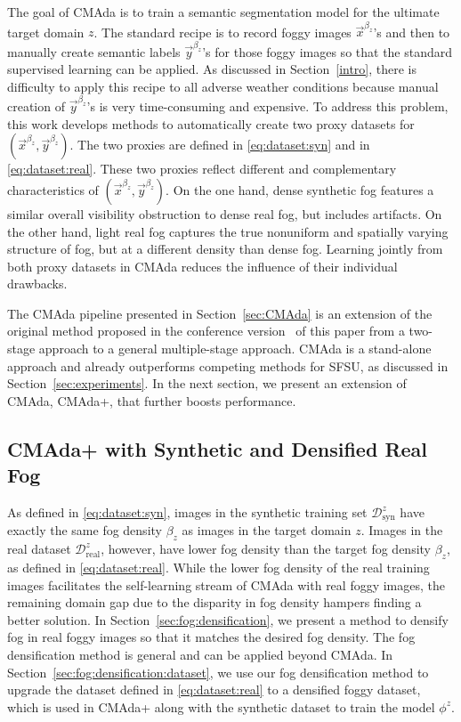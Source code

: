 \documentclass[twocolumn]{svjour3}          \smartqed  \usepackage{graphicx}
\begin{document}
The goal of CMAda is to train a semantic segmentation model for the ultimate target domain $z$. The standard recipe is to record foggy images $\vec{x}^{\beta_z}$'s and then to manually create semantic labels $\vec{y}^{\beta_z}$'s for those foggy images so that the standard supervised learning can be applied. As discussed in Section~\ref{intro}, there is difficulty to apply this recipe to all adverse weather conditions because manual creation of $\vec{y}^{\beta_z}$'s is very time-consuming and expensive. To address this problem, this work develops methods to automatically create two proxy datasets for $(\vec{x}^{\beta_z}, \vec{y}^{\beta_z})$. The two proxies are defined in \eqref{eq:dataset:syn} and in \eqref{eq:dataset:real}. These two proxies reflect different and complementary characteristics of $(\vec{x}^{\beta_z}, \vec{y}^{\beta_z})$.  On the one hand, dense synthetic fog features a similar overall visibility obstruction to dense real fog, but includes artifacts. On the other hand, light real fog captures the true nonuniform and spatially varying structure of fog, but at a different density than dense fog. Learning jointly from both proxy datasets in CMAda reduces the influence of their individual drawbacks.

The CMAda pipeline presented in Section~\ref{sec:CMAda} is an extension of the original method proposed in the conference version~\cite{dense:SFSU:eccv18} of this paper from a two-stage approach to a general multiple-stage approach. CMAda is a stand-alone approach and already outperforms competing methods for SFSU, as discussed in Section~\ref{sec:experiments}. In the next section, we present an extension of CMAda, CMAda+, that further boosts performance.
       
\subsection{CMAda+ with Synthetic and Densified Real Fog}
\label{sec:CMAda+}

As defined in \eqref{eq:dataset:syn}, images in the synthetic training set $\mathcal{D}_{\text{syn}}^z$ have exactly the same fog density $\beta_z$ as images in the target domain $z$. Images in the real dataset $\mathcal{D}_{\text{real}}^z$, however, have lower fog density than the target fog density $\beta_z$, as defined in \eqref{eq:dataset:real}. While the lower fog density of the real training images facilitates the self-learning stream of CMAda with real foggy images, the remaining domain gap due to the disparity in fog density hampers finding a better solution. In Section~\ref{sec:fog:densification}, we present a method to densify fog in real foggy images so that it matches the desired fog density. The fog densification method is general and can be applied beyond CMAda. In Section~\ref{sec:fog:densification:dataset}, we use our fog densification method to upgrade the dataset defined in \eqref{eq:dataset:real} to a densified foggy dataset, which is used in CMAda+ along with the synthetic dataset to train the model $\phi^z$. 
\end{document}
